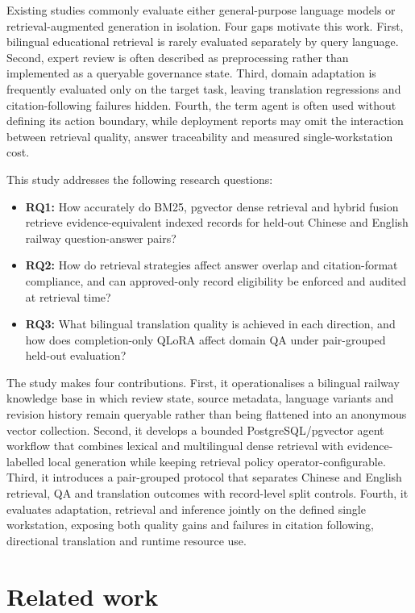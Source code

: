 Existing studies commonly evaluate either general-purpose language models or retrieval-augmented generation in isolation. Four gaps motivate this work. First, bilingual educational retrieval is rarely evaluated separately by query language. Second, expert review is often described as preprocessing rather than implemented as a queryable governance state. Third, domain adaptation is frequently evaluated only on the target task, leaving translation regressions and citation-following failures hidden. Fourth, the term agent is often used without defining its action boundary, while deployment reports may omit the interaction between retrieval quality, answer traceability and measured single-workstation cost.

This study addresses the following research questions:

\begin{itemize}
\item \textbf{RQ1:} How accurately do BM25, pgvector dense retrieval and hybrid fusion retrieve evidence-equivalent indexed records for held-out Chinese and English railway question-answer pairs?
\item \textbf{RQ2:} How do retrieval strategies affect answer overlap and citation-format compliance, and can approved-only record eligibility be enforced and audited at retrieval time?
\item \textbf{RQ3:} What bilingual translation quality is achieved in each direction, and how does completion-only QLoRA affect domain QA under pair-grouped held-out evaluation?
\end{itemize}

The study makes four contributions. First, it operationalises a bilingual railway knowledge base in which review state, source metadata, language variants and revision history remain queryable rather than being flattened into an anonymous vector collection. Second, it develops a bounded PostgreSQL/pgvector agent workflow that combines lexical and multilingual dense retrieval with evidence-labelled local generation while keeping retrieval policy operator-configurable. Third, it introduces a pair-grouped protocol that separates Chinese and English retrieval, QA and translation outcomes with record-level split controls. Fourth, it evaluates adaptation, retrieval and inference jointly on the defined single workstation, exposing both quality gains and failures in citation following, directional translation and runtime resource use.

\section{Related work}

